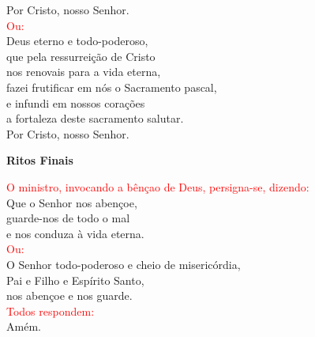 \documentclass{book}
\begin{document}
\begin{flushleft}
    Por Cristo, nosso Senhor.
    \vspace{.1cm} \\
    \textcolor{red}{Ou:}
    \vspace{.1cm} \\
    Deus eterno e todo-poderoso, \\
    que pela ressurreição de Cristo \\
    nos renovais para a vida eterna, \\
    fazei frutificar em nós o Sacramento pascal, \\
    e infundi em nossos corações \\
    a fortaleza deste sacramento salutar. \\
    Por Cristo, nosso Senhor.
\end{flushleft}
\begin{center}
    \textbf{Ritos Finais}
\end{center}
\begin{flushleft}
    \textcolor{red}{O ministro, invocando a bênçao de Deus, persigna-se, dizendo:}
    \vspace{.1cm} \\
    Que o Senhor nos abençoe, \\
    guarde-nos de todo o mal \\
    e nos conduza à vida eterna.
    \vspace{.1cm} \\
    \textcolor{red}{Ou:}
    \vspace{.1cm} \\
    O Senhor todo-poderoso e cheio de misericórdia, \\
    Pai e Filho e Espírito Santo, \\
    nos abençoe e nos guarde.
    \vspace{.1cm} \\
    \textcolor{red}{Todos respondem:}
    \vspace{.1cm} \\
    Amém.
\end{flushleft}
\end{document}
